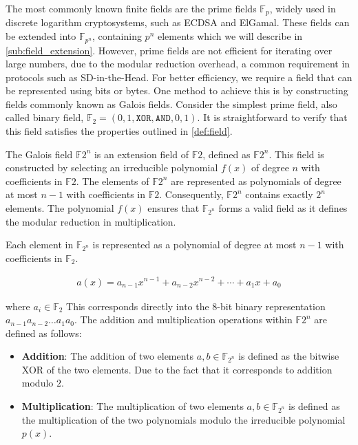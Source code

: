 \documentclass[11pt]{report}
\theoremstyle{definition}
\theoremstyle{plain}
\begin{document}
\noindent
The most commonly known finite fields are the prime fields $\mathbb{F}_p$, widely used in discrete logarithm cryptosystems, such as ECDSA and ElGamal. These fields can be extended into $\mathbb{F}_{p^n}$, containing $p^n$ elements which we will describe in \autoref{sub:field_extension}. However, prime fields are not efficient for iterating over large numbers, due to the modular reduction overhead, a common requirement in protocols such as SD-in-the-Head. For better efficiency, we require a field that can be represented using bits or bytes. One method to achieve this is by constructing fields commonly known as Galois fields. Consider the simplest prime field, also called binary field, $\mathbb{F}_2 = ({0,1}, \texttt{XOR}, \texttt{AND}, 0, 1)$. It is straightforward to verify that this field satisfies the properties outlined in \autoref{def:field}.

The Galois field $\mathbb{F}{2^n}$ is an extension field of $\mathbb{F}2$, defined as $\mathbb{F}{2^n}$. This field is constructed by selecting an irreducible polynomial $f(x)$ of degree $n$ with coefficients in $\mathbb{F}2$. The elements of $\mathbb{F}{2^n}$ are represented as polynomials of degree at most $n-1$ with coefficients in $\mathbb{F}2$. Consequently, $\mathbb{F}{2^n}$ contains exactly $2^n$ elements. The polynomial $f(x)$ ensures that $\mathbb{F}_{2^n}$ forms a valid field as it defines the modular reduction in multiplication.

Each element in $\mathbb{F}_{2^n}$ is represented as a polynomial of degree at most $n-1$ with coefficients in $\mathbb{F}_2$.

\begin{align*}
  a(x) = a_{n-1}x^{n-1} + a_{n-2}x^{n-2} + \cdots + a_1x + a_0
\end{align*}

\noindent
where $a_i \in \mathbb{F}_2$ This corresponds directly into the 8-bit binary representation $a_{n-1}a_{n-2}\dots a_1a_0$. The addition and multiplication operations within $\mathbb{F}{2^n}$ are defined as follows:

\begin{itemize}
  \item \textbf{Addition}: The addition of two elements $a,b \in \mathbb{F}_{2^n}$ is defined as the bitwise XOR of the two elements. Due to the fact that it corresponds to addition modulo $2$.
  \item \textbf{Multiplication}: The multiplication of two elements $a,b \in \mathbb{F}_{2^n}$ is defined as the multiplication of the two polynomials modulo the irreducible polynomial $p(x)$.
\end{itemize}
\end{document}
